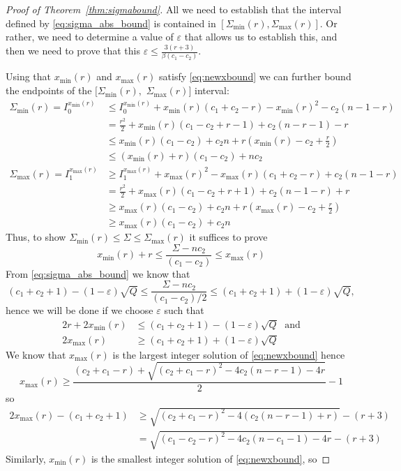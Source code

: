 \documentclass[10pt,a4paper]{amsart}
\newcommand{\Smax}[1][r]{\Sigma_{\max}(#1)}
\newcommand{\Smin}[1][r]{\Sigma_{\min}(#1)}
\newcommand{\amax}[1][r]{x_{\max}(#1)}
\newcommand{\amin}[1][r]{x_{\min}(#1)}
\newcommand{\ep}{\varepsilon}
\begin{document}
\begin{proof}[Proof of Theorem~\ref{thm:sigmabound}] All we need to establish that the interval defined by \eqref{eq:sigma_abs_bound} is contained in $[\Smin,\Smax]$. Or rather, we need to determine a value of $\ep$ that allows us to establish this, and then we need to prove that this $\ep \leq \frac{3(r+3)}{\beta(c_1-c_2)}$.


Using that $\amin$ and $\amax$ satisfy \eqref{eq:newxbound} we can further bound the endpoints of the $[\Smin,$ $\Smax]$ interval:
\begin{align}\nonumber
\Smin = I^{\amin}_0 &\leq I^{\amin}_0 + \amin(c_1+c_2-r)-\amin^2-c_2(n-1-r) \\ \nonumber
    &=\frac{r^2}{2}+ \amin(c_1-c_2+r-1)+c_2(n-r-1) -r\\\nonumber
    &\leq \amin(c_1-c_2) +c_2 n + r\left(\amin - c_2 + \frac{r}{2} \right) \\ \label{eq:sminlower}  &\leq (\amin+r)(c_1-c_2) + nc_2 \\
\nonumber
\Smax =I^{\amax}_1 &\geq I^{\amax}_1 + \amax^2-\amax(c_1+c_2-r) + c_2(n-1-r) \\ \nonumber
    &=\frac{r^2}{2} + \amax(c_1-c_2+r+1)+c_2(n-1-r)+r \\ \nonumber
    &\geq \amax(c_1 - c_2) + c_2 n + r\left(\amax - c_2 + \frac{r}{2} \right)\\ \label{eq:smaxlower}
    &\geq \amax(c_1 - c_2) + c_2 n
\end{align}
Thus, to show $\Smin \leq \Sigma \leq \Smax$ it suffices to prove
\[ \amin +r \leq \frac{\Sigma - n c_2}{(c_1-c_2) } \leq \amax \]
From \eqref{eq:sigma_abs_bound} we know that
\[ (c_1+c_2+1) - (1-\varepsilon)\sqrt{Q} \leq \frac{\Sigma-nc_2}{(c_1-c_2)/2} \leq (c_1+c_2+1)+(1-\ep)\sqrt{Q},\] hence we will be done if we choose $\ep$ such that
\begin{align*}
2r+2\amin&\leq(c_1+c_2+1)-(1-\ep)\sqrt{Q} \;\mbox{ and}\\
2\amax &\geq (c_1+c_2+1)+(1-\ep)\sqrt{Q}
\end{align*}
We know that \(\amax\) is the largest integer solution of \eqref{eq:newxbound} hence
\[\amax \geq \frac{(c_2+c_1-r)+\sqrt{(c_2+c_1-r)^2-4c_2(n-r-1)-4r}}{2} - 1\] so
\begin{align*}
     2\amax - (c_1+c_2+1) &\geq \sqrt{(c_2+c_1-r)^2-4(c_2(n-r-1)+r)} - (r+3)\\
     &= \sqrt{ (c_1-c_2 -r)^2 - 4c_2(n-c_1-1)-4r} - (r+3)
\end{align*}
Similarly, $\amin$ is the smallest integer solution of \eqref{eq:newxbound}, so

\end{proof}
\end{document}
